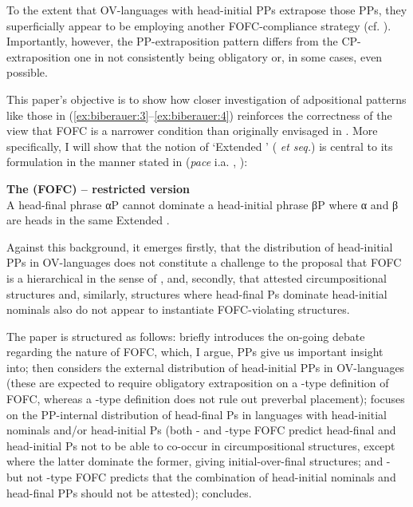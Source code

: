 \documentclass[output=paper]{LSP/langsci}
\begin{document}
To the extent that OV-languages with head-initial PPs extrapose those PPs, they superficially appear to be employing another FOFC-compliance strategy (cf. \citealt{Sheehan2013fofc}). Importantly, however, the PP-extraposition pattern differs from the CP-extraposition one in not consistently being obligatory or, in some cases, even possible. 

This paper’s objective is to show how closer investigation of adpositional patterns like those in (\ref{ex:biberauer:3}--\ref{ex:biberauer:4}) reinforces the correctness of the view that FOFC is a narrower condition than originally envisaged in \citet{Holmberg2000deriving}. More specifically, I will show that the notion of ‘Extended ’ (\citealt{Grimshaw1990} \textit{et seq.}) is central to its formulation in the manner stated in  (\textit{pace} i.a. \citealt{Sheehan2013fofc,Hawkins2013}, \citealt{EtxepareHaddicanTV}):

\ea%
    \label{ex:biberauer:6} 
\textbf{The  (FOFC) – restricted version}\\
A head-final phrase αP cannot dominate a head-initial phrase βP where α and β are heads in the same Extended .\\
\citep[171]{BiberauerEtAl2014syntactic}
\z

Against this background, it emerges firstly, that the distribution of head-initial PPs in OV-languages does not constitute a challenge to the proposal that FOFC is a hierarchical  in the sense of \citet{Whitman2008}, and, secondly, that attested circumpositional structures and, similarly, structures where head-final Ps dominate head-initial nominals also do not appear to instantiate FOFC-violating structures. 

The paper is structured as follows:  briefly introduces the on-going debate regarding the nature of FOFC, which, I argue, PPs give us important insight into;
 then considers the external distribution of head-initial PPs in OV-languages (these are expected to require obligatory extraposition on a -type definition of FOFC, whereas a -type definition does not rule out preverbal placement); 
 focuses on the PP-internal distribution of head-final Ps in languages with head-initial nominals and/or head-initial Ps (both - and -type FOFC predict head-final and head-initial Ps not to be able to co-occur in circumpositional structures, except where the latter dominate the former, giving initial-over-final structures; and - but not -type FOFC predicts that the combination of head-initial nominals and head-final PPs should not be attested); 
 concludes.
\end{document}
